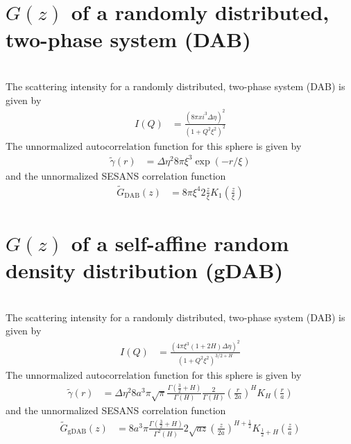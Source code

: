 \section{$G(z)$ of a randomly distributed, two-phase system (DAB) }~\\
The scattering intensity for a randomly distributed, two-phase system (DAB) is given by
\cite{DebyeBueche1949,DAB1957,Andersson2008}
\begin{align}
I(Q) &= \frac{\left(8 \pi xi^3 \Delta\eta\right)^2}{ \left(1+Q^2\xi^2\right)^2}
\end{align}
The unnormalized autocorrelation function for this sphere is given by
\begin{align}
\tilde{\gamma}(r) &=
 \Delta\eta^2 8\pi\xi^3 \exp\left( -r/\xi\right)
\end{align}
and the unnormalized SESANS correlation function
\begin{align}
\tilde{G}_\mathrm{DAB}(z)&= 8\pi\xi^4 2\frac{z}{\xi}K_1\left(\frac{z}{\xi}\right)
\end{align}

\section{$G(z)$ of a self-affine random density distribution (gDAB) }~\\
The scattering intensity for a randomly distributed, two-phase system (DAB) is given by \cite{Klimes2002,Hunter2006,Andersson2008}
\begin{align}
I(Q) &= \frac{\left(4 \pi \xi^3 (1+2H) \Delta\eta\right)^2}{ \left(1+Q^2\xi^2\right)^{3/2+H}}
\end{align}
The unnormalized autocorrelation function for this sphere is given by
\begin{align}
\tilde{\gamma}(r) &=
 \Delta\eta^2 8a^3\pi\sqrt{\pi}\frac{\Gamma\left(\frac{3}{2}+H\right)}{\Gamma\left(H\right)}\frac{2}{\Gamma(H)}\left(\frac{r}{2a}\right)^H K_H\left(\frac{r}{a}\right)
\end{align}
and the unnormalized SESANS correlation function
\begin{align}
\tilde{G}_\mathrm{gDAB}(z)&=  8a^3\pi\frac{\Gamma\left(\frac{3}{2}+H\right)}{\Gamma^2\left(H\right)} 2\sqrt{az}\left(\frac{z}{2a}\right)^{H+\frac12}K_{\frac12+H}\left(\frac{z}{a}\right)
\end{align}

